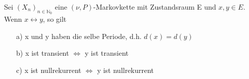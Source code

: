 \label{x und y selbe Periode, x transient y auch x nullrekurrent y auch}
Sei $(X_{n})_{n \in \mathbb{N}_{0}}$ eine $(\nu,P)$-Markovkette mit Zustandsraum E und $x,y \in E$. Wenn $x \leftrightarrow y$, so gilt
\begin{itemize}
\item[a)] x und y haben die selbe Periode, d.h. $d(x) = d(y)$ 
\item[b)] x ist transient $\Leftrightarrow$ y ist transient
\item[c)] x ist nullrekurrent $\Leftrightarrow$ y ist nullrekurrent
\end{itemize}